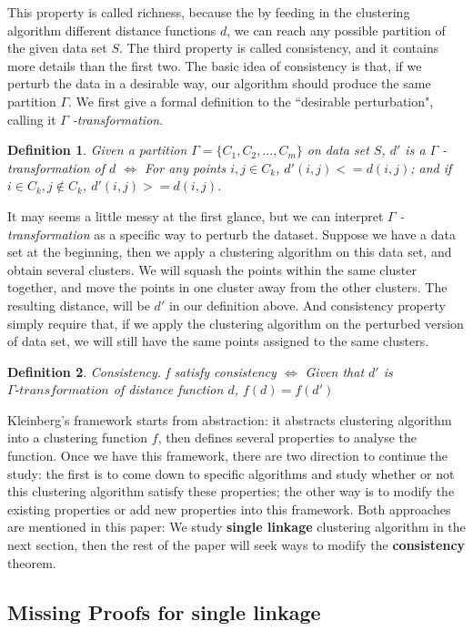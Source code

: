 \documentclass{uonmathreport}
\newtheorem{definition}{Definition}[section]
\begin{document}
This property is called richness, because the by feeding in the clustering algorithm different distance functions $d$, we can reach any possible partition of the given data set $S$. The third property is called consistency, and it contains more details than the first two. The basic idea of consistency is that, if we perturb the data in a desirable way, our algorithm should produce the same partition $\Gamma$. We first give a formal definition to the ``desirable perturbation", calling it $\Gamma$ \textit{-transformation}.
\begin{definition}
Given a partition $\Gamma=\{C_1,C_2,...,C_m\}$ on data set $S$, 
$d'$ is a $\Gamma$ \textit{-transformation} of $d$ $\iff$ For any points $i,j\in C_k$, $d'(i,j)<=d(i,j)$; and if $i \in C_k, j\notin C_k$, $d'(i,j)>=d(i,j)$.
\end{definition}

It may seems a little messy at the first glance, but we can interpret $\Gamma$ \textit{-transformation} as a specific way to perturb the dataset. Suppose we have a data set at the beginning, then we apply a clustering algorithm on this data set, and obtain several clusters. We will squash the points within the same cluster together, and move the points in one cluster away from the other clusters. The resulting distance, will be $d'$ in our definition above. And consistency property simply require that, if we apply the clustering algorithm on the perturbed version of data set, we will still have the same points assigned to the same clusters.

\begin{definition}
Consistency. f satisfy consistency $\iff$ Given that $d'$ is $\Gamma \textit{-transformation}$ of distance function $d$, $f(d) = f(d')$
\end{definition}

Kleinberg's framework starts from abstraction: it abstracts clustering algorithm into a clustering function $f$, then defines several properties to analyse the function. Once we have this framework, there are two direction to continue the study: the first is to come down to specific algorithms and study whether or not this clustering algorithm satisfy these properties; the other way is to modify the existing properties or add new properties into this framework. Both approaches are mentioned in this paper: We study \textbf{single linkage} clustering algorithm in the next section, then the rest of the paper will seek ways to modify the \textbf{consistency} theorem.
\subsection{Missing Proofs for single linkage} \label{subsec:Related Work}
\end{document}
